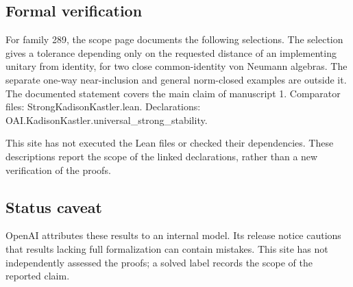 \documentclass[11pt]{article}
\begin{document}
\subsection{Formal verification}
For family 289, the scope page documents the following selections. The selection gives a tolerance depending only on the requested distance of an implementing unitary from identity, for two close common-identity von Neumann algebras. The separate one-way near-inclusion and general norm-closed examples are outside it. The documented statement covers the main claim of manuscript 1. Comparator files: StrongKadisonKastler.lean. Declarations: OAI.KadisonKastler.universal\_strong\_stability.

This site has not executed the Lean files or checked their dependencies. These descriptions report the scope of the linked declarations, rather than a new verification of the proofs.

\subsection{Status caveat}
OpenAI attributes these results to an internal model. Its release notice cautions that results lacking full formalization can contain mistakes. This site has not independently assessed the proofs; a solved label records the scope of the reported claim.
\end{document}

